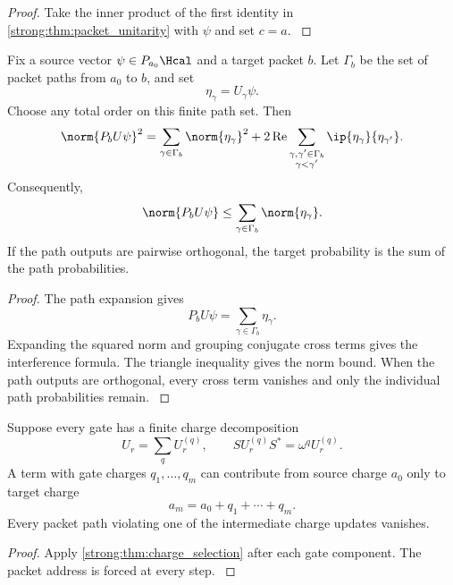 \begin{proof}\label{strong:proof:014}
Take the inner product of the first identity in \cref{strong:thm:packet_unitarity} with \(\psi\) and set \(c=a\).
\label{strong:proof:014:end}\end{proof}

\begin{theorem}\label{strong:theorem:009}\label{strong:thm:path_interference}
Fix a source vector \(\psi\in P_{a_0}\Hcal\) and a target packet \(b\). Let \(\Gamma_b\) be the set of packet paths from \(a_0\) to \(b\), and set
\[
\eta_\gamma=U_\gamma\psi.
\]
Choose any total order on this finite path set. Then
\[
\norm{P_bU\psi}^2
=
\sum_{\gamma\in\Gamma_b}\norm{\eta_\gamma}^2
+
2\operatorname{Re}
\sum_{\substack{\gamma,\gamma'\in\Gamma_b\\ \gamma<\gamma'}}
\ip{\eta_\gamma}{\eta_{\gamma'}}.
\]
Consequently,
\[
\norm{P_bU\psi}
\leq
\sum_{\gamma\in\Gamma_b}\norm{\eta_\gamma}.
\]
If the path outputs are pairwise orthogonal, the target probability is the sum of the path probabilities.
\end{theorem}

\begin{proof}\label{strong:proof:015}
The path expansion gives
\[
P_bU\psi=\sum_{\gamma\in\Gamma_b}\eta_\gamma.
\]
Expanding the squared norm and grouping conjugate cross terms gives the interference formula. The triangle inequality gives the norm bound. When the path outputs are orthogonal, every cross term vanishes and only the individual path probabilities remain.
\label{strong:proof:015:end}\end{proof}

\begin{proposition}\label{strong:proposition:002}\label{strong:prop:charge_pruning}
Suppose every gate has a finite charge decomposition
\[
U_r=\sum_qU_r^{(q)},
\qquad
SU_r^{(q)}S^*=\omega^qU_r^{(q)}.
\]
A term with gate charges \(q_1,\ldots,q_m\) can contribute from source charge \(a_0\) only to target charge
\[
a_m=a_0+q_1+\cdots+q_m.
\]
Every packet path violating one of the intermediate charge updates vanishes.
\end{proposition}

\begin{proof}\label{strong:proof:016}
Apply \cref{strong:thm:charge_selection} after each gate component. The packet address is forced at every step.
\label{strong:proof:016:end}\end{proof}

